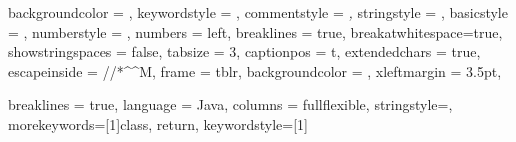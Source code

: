 
\usepackage{listings}


\captionsetup[lstlisting]{
    format = listing
}

\lstset 
{
    backgroundcolor = \color{white},
    keywordstyle = \color{blue},
    commentstyle = \color{gray!75}\textit,
    stringstyle = \color{green},
    basicstyle = \scriptsize\ttfamily,
    numberstyle = \tiny,
    numbers = left,
    breaklines = true,
    breakatwhitespace=true,
    showstringspaces = false,
    tabsize = 3,
    captionpos = t,
    extendedchars = true,
    escapeinside = {//*}{\^^M}, %
    frame = tblr,
    backgroundcolor = \color{gray!5},
    xleftmargin = 3.5pt,
}

\renewcommand{\lstlistingname}{Code Snippet}

\captionsetup[lstlisting]{format = listing, labelfont = white, textfont = white}


{
    breaklines = true,
    language = Java,
    columns = fullflexible,
    stringstyle=\color{eclipse_blue},
    morekeywords=[1]{class, return}, 
    keywordstyle=[1]\color{eclipse_red}
}

\newcommand{\androidinline}[1]{\lstinline[style = java, basicstyle = \ttfamily\normalsize]{#1}}
